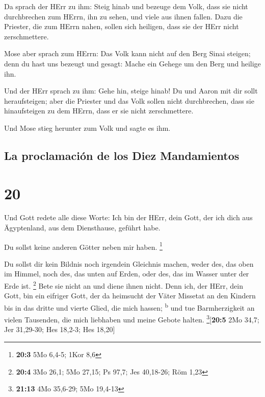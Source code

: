  Da sprach der HErr zu ihm: Steig hinab und bezeuge dem
Volk, dass sie nicht durchbrechen zum HErrn, ihn zu sehen, und viele aus
ihnen fallen.  Dazu die Priester, die zum HErrn nahen,
sollen sich heiligen, dass sie der HErr nicht zerschmettere.

 Mose aber sprach zum HErrn: Das Volk kann nicht auf den
Berg Sinai steigen; denn du hast uns bezeugt und gesagt: Mache ein
Gehege um den Berg und heilige ihn.

 Und der HErr sprach zu ihm: Gehe hin, steige hinab! Du
und Aaron mit dir sollt heraufsteigen; aber die Priester und das Volk
sollen nicht durchbrechen, dass sie hinaufsteigen zu dem HErrn, dass er
sie nicht zerschmettere.

 Und Mose stieg herunter zum Volk und sagte es ihm.

\hypertarget{la-proclamaciuxf3n-de-los-diez-mandamientos}{%
\subsection{La proclamación de los Diez
Mandamientos}\label{la-proclamaciuxf3n-de-los-diez-mandamientos}}

\hypertarget{section-19}{%
\section{20}\label{section-19}}

 Und Gott redete alle diese Worte:  Ich bin
der HErr, dein Gott, der ich dich aus Ägyptenland, aus dem Diensthause,
geführt habe.

 Du sollst keine anderen Götter neben mir haben.
\footnote{\textbf{20:3} 5Mo 6,4-5; 1Kor 8,6}

 Du sollst dir kein Bildnis noch irgendein Gleichnis
machen, weder des, das oben im Himmel, noch des, das unten auf Erden,
oder des, das im Wasser unter der Erde ist. \footnote{\textbf{20:4} 3Mo
  26,1; 5Mo 27,15; Ps 97,7; Jes 40,18-26; Röm 1,23}  Bete
sie nicht an und diene ihnen nicht. Denn ich, der HErr, dein Gott, bin
ein eifriger Gott, der da heimsucht der Väter Missetat an den Kindern
bis in das dritte und vierte Glied, die mich hassen; \textsuperscript{b}
 und tue Barmherzigkeit an vielen Tausenden, die mich
liebhaben und meine Gebote halten. \footnote{\textbf{21:13} 4Mo 35,6-29;
  5Mo 19,4-13}{[}\textbf{20:5} 2Mo 34,7; Jer 31,29-30; Hes 18,2-3; Hes
18,20{]}

